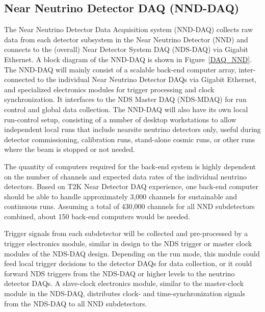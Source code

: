 \subsection{Near Neutrino Detector DAQ (NND-DAQ)} %
\label{sec:nd:nnd:daq}


The Near Neutrino Detector Data Acquisition system (NND-DAQ) collects raw data from 
each %
detector subsystem in the Near Neutrino Detector (NND) and connects to the (overall) Near 
Detector System DAQ (NDS-DAQ) via Gigabit Ethernet. A block diagram of the NND-DAQ is
shown in Figure~\ref{DAQ_NND}. The NND-DAQ will mainly consist 
of a scalable back-end computer array, inter-connected to the individual Near Neutrino 
Detector DAQs via Gigabit Ethernet, and specialized electronics modules for trigger 
processing and clock synchronization. It interfaces to the NDS Master DAQ (NDS-MDAQ) for 
run control and global data collection. The NND-DAQ will also have its own local run-control setup, 
consisting of a number of desktop workstations to allow independent local runs that include 
nearsite neutrino detectors only, useful during detector commissioning, calibration runs, 
stand-alone cosmic runs, or other runs where the beam is stopped or not needed.

The quantity of computers required for the back-end system is highly dependent on the 
number of channels and expected data rates of the individual neutrino detectors. Based on 
T2K Near Detector DAQ experience, one back-end computer should be able to handle 
approximately 3,000 channels for sustainable and continuous runs. Assuming a total of 
430,000 channels for all NND subdetectors combined, about 150 back-end computers would be 
needed.

Trigger signals from each subdetector will be collected and pre-processed by a 
trigger electronics module, similar in design to the NDS  trigger or master clock modules 
of the NDS-DAQ design. Depending on the run mode, this module could feed local trigger 
decisions to the detector DAQs for data collection, or it could forward NDS triggers 
from the NDS-DAQ or higher levels to the neutrino detector DAQs.  A slave-clock electronics 
module, similar to the master-clock module in the NDS-DAQ, distributes clock- and 
time-synchronization signals from the NDS-DAQ to all NND subdetectors.


